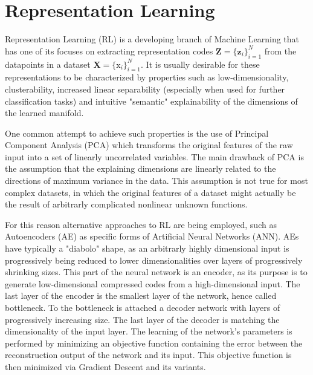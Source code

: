 \section{Representation Learning}
Representation Learning (RL) is a developing branch of Machine Learning that has one of its
focuses on extracting representation codes $\mathbf{Z} = \{\mathbf{z}_i\}_{i=1}^N$ from the datapoints in a dataset $\mathbf{X} = \{\mathrm{x}_i\}_{i=1}^N$.
It is usually desirable for these representations to be characterized by properties such as low-dimensionality, clusterability, increased linear separability (especially when used for further classification tasks) and intuitive "semantic" explainability of the dimensions of the learned manifold.

One common attempt to achieve such properties is the use of Principal Component Analysis (PCA) which transforms the original features of the raw input into a set of linearly uncorrelated variables.
The main drawback of PCA is the assumption that the explaining dimensions are linearly related to the directions of maximum variance in the data.
This assumption is not true for most complex datasets, in which the original features of a dataset might actually be the result of arbitrarly complicated nonlinear unknown functions.

For this reason alternative approaches to RL are being employed, such as Autoencoders (AE) as specific forms of Artificial Neural Networks (ANN).
AEs have typically a "diabolo" shape, as an arbitrarly highly dimensional input is progressively being reduced to lower dimensionalities over layers of progressively shrinking sizes.
This part of the neural network is an encoder, as its purpose is to generate low-dimensional compressed codes from a high-dimensional input.
The last layer of the encoder is the smallest layer of the network, hence called bottleneck.
To the bottleneck is attached a decoder network with layers of progressively increasing size.
The last layer of the decoder is matching the dimensionality of the input layer.
The learning of the network's parameters is performed by minimizing an objective function containing the error between the reconstruction output of the network and its input.
This objective function is then minimized via Gradient Descent and its variants.

